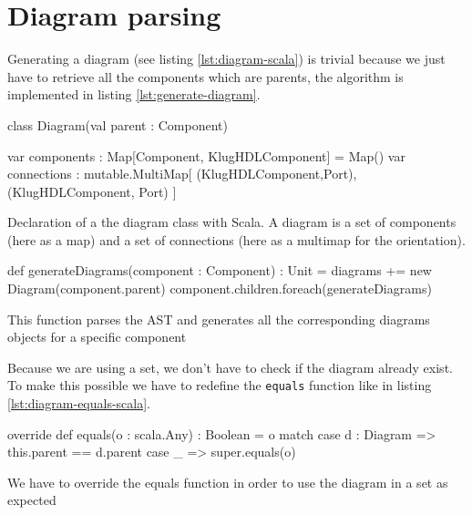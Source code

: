 \section{Diagram parsing}
\label{sec:diagrams-parsing}

Generating a diagram (see listing \ref{lst:diagram-scala}) is trivial because we
just have to retrieve all the components which are parents, the algorithm is
implemented in listing \ref{lst:generate-diagram}. 
\begin{listing}[H]
  \centering
  \begin{scalacode}
    class Diagram(val parent : Component) {

      var components : Map[Component, KlugHDLComponent] = Map()
      var connections : mutable.MultiMap[
          (KlugHDLComponent,Port),
          (KlugHDLComponent, Port)
        ]
      }
  \end{scalacode}
  \caption[Diagram class declaration]{Declaration of a the diagram class with
    Scala. A diagram is a set of components (here as a map) and a set of
    connections (here as a multimap for the orientation).}
  \label{lst:diagram-scala}
\end{listing}

\begin{listing}[H]
  \centering
  \begin{scalacode}
  def generateDiagrams(component : Component) : Unit = {
    diagrams += new Diagram(component.parent)
    component.children.foreach(generateDiagrams)
  }
  \end{scalacode}
  \caption[Parsing the diagrams form the AST]{This function parses the AST and
    generates all the corresponding diagrams objects for a specific component}
  \label{lst:generate-diagram}
\end{listing}

Because we are using a set,
we don't have to check if the diagram already exist. To make this possible we
have to redefine the \verb|equals| function like in listing \ref{lst:diagram-equals-scala}.

\begin{listing}[H]
  \centering
  \begin{scalacode}
  override def equals(o : scala.Any) : Boolean = o match {
    case d : Diagram => this.parent == d.parent
    case _ => super.equals(o)
  }
  \end{scalacode}
  \caption[Equals function implementation for the Diagram Class]{We have to
    override the equals function in order to use the diagram in a set as expected}
  \label{lst:diagram-equals-scala}
\end{listing}

